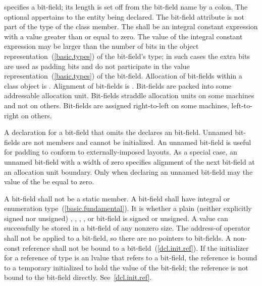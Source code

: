 %
%
specifies a bit-field;
its length is set off from the bit-field name by a colon. The optional  appertains to the entity being declared. The bit-field
attribute is not part of the type of the class member. The
 shall be an integral constant expression
with a value greater than or equal to zero. The
value of the integral constant expression may
be larger than the number of bits in the object
representation~(\ref{basic.types}) of the bit-field's type; in such
cases the extra bits are used as padding bits and do not participate in
the value representation~(\ref{basic.types}) of the bit-field.
%
Allocation of bit-fields within a class object is
.
%
Alignment of bit-fields is .
%
Bit-fields are packed into some addressable allocation unit.
\enternote
Bit-fields straddle allocation units on some machines and not on others.
Bit-fields are assigned right-to-left on some machines, left-to-right on
others.
\exitnote

\pnum
{}%
A declaration for a bit-field that omits the 
declares an  bit-field. Unnamed bit-fields are not
members and cannot be initialized.
\enternote
An unnamed bit-field is useful for padding to conform to
externally-imposed layouts.
\exitnote
{}%
%
As a special case, an unnamed bit-field with a width of zero specifies
alignment of the next bit-field at an allocation unit boundary. Only
when declaring an unnamed bit-field may the value of the
 be equal to zero.

\pnum
{}%
A bit-field shall not be a static member. A bit-field shall have
integral or enumeration type~(\ref{basic.fundamental}).
%
It is  whether a plain (neither
explicitly signed nor unsigned) , , ,
, or 
bit-field is signed or unsigned.
%
A  value can successfully be stored in a bit-field of any
nonzero size.
%
The address-of operator \tcode{\&} shall not be applied to a bit-field,
so there are no pointers to bit-fields.
%
%
%
A non-const reference shall not be bound to a
bit-field~(\ref{dcl.init.ref}).
\enternote
If the initializer for a reference of type   is
an lvalue that refers to a bit-field, the reference is bound to a
temporary initialized to hold the value of the bit-field; the reference
is not bound to the bit-field directly. See~\ref{dcl.init.ref}.
\exitnote


